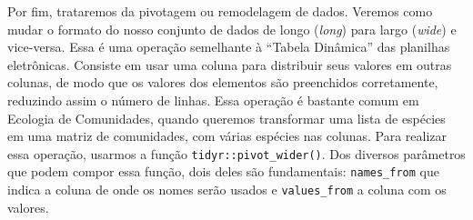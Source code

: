 \documentclass[
]{book}
\begin{document}
Por fim, trataremos da pivotagem ou remodelagem de dados. Veremos como mudar o formato do nosso conjunto de dados de longo (\emph{long}) para largo (\emph{wide}) e vice-versa. Essa é uma operação semelhante à ``Tabela Dinâmica'' das planilhas eletrônicas. Consiste em usar uma coluna para distribuir seus valores em outras colunas, de modo que os valores dos elementos são preenchidos corretamente, reduzindo assim o número de linhas. Essa operação é bastante comum em Ecologia de Comunidades, quando queremos transformar uma lista de espécies em uma matriz de comunidades, com várias espécies nas colunas. Para realizar essa operação, usarmos a função \texttt{tidyr::pivot\_wider()}. Dos diversos parâmetros que podem compor essa função, dois deles são fundamentais: \texttt{names\_from} que indica a coluna de onde os nomes serão usados e \texttt{values\_from} a coluna com os valores.
\end{document}
